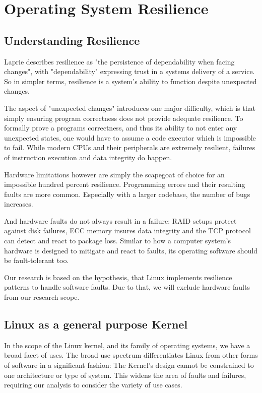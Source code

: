 \chapter{Operating System Resilience}
\section{Understanding Resilience}
Laprie describes resilience as "the persistence of dependability when facing changes", with "dependability" expressing trust in a systems delivery of a service.\cite{Laprie2008}
So in simpler terms, resilience is a system's ability to function despite unexpected changes.

The aspect of "unexpected changes" introduces one major difficulty, which is that simply ensuring program correctness does not provide adequate resilience. To formally prove a programs correctness, and thus its ability to not enter any unexpected states, one would have to assume a code executor which is impossible to fail. While modern CPUs and their peripherals are extremely resilient, failures of instruction execution and data integrity do happen. 

Hardware limitations however are simply the scapegoat of choice for an impossible hundred percent resilience. Programming errors and their resulting faults are more common. Especially with a larger codebase, the number of bugs increases.

And hardware faults do not always result in a failure: RAID setups protect against disk failures, ECC memory insures data integrity and the TCP protocol can detect and react to package loss.
Similar to how a computer system's hardware is designed to mitigate and react to faults, its operating software should be fault-tolerant too. 

Our research is based on the hypothesis, that Linux implements resilience patterns to handle software faults. Due to that, we will exclude hardware faults from our research scope.

\section{Linux as a general purpose Kernel}
In the scope of the Linux kernel, and its family of operating systems, we have a broad facet of uses. The broad use spectrum differentiates Linux from other forms of software in a significant fashion: The Kernel's design cannot be constrained to one architecture or type of system. This widens the area of faults and failures, requiring our analysis to consider the variety of use cases.

